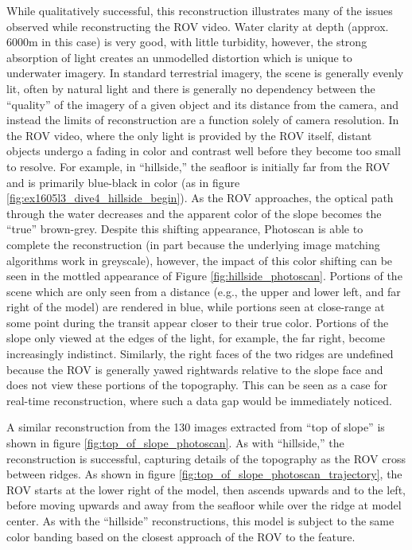 \documentclass[letterpaper,12pt]{article}
\begin{document}
While qualitatively successful, this reconstruction illustrates many of the issues observed while reconstructing the ROV video.    Water clarity at depth (approx. 6000m in this case) is very good, with little turbidity, however, the strong absorption of light creates an unmodelled distortion which is unique to underwater imagery.   In standard terrestrial imagery, the scene is generally evenly lit, often by natural light and there is generally no dependency between the ``quality'' of the imagery of a given object and its distance from the camera, and instead the limits of reconstruction are a function solely of camera resolution.   In the ROV video, where the only light is provided by the ROV itself, distant objects undergo a fading in color and contrast well before they become too small to resolve.   For example, in ``hillside,'' the seafloor is initially far from the ROV and is primarily blue-black in color (as in figure \ref{fig:ex1605l3_dive4_hillside_begin}).  As the ROV approaches, the optical path through the water decreases and the apparent color of the slope becomes the ``true'' brown-grey.   Despite this shifting appearance, Photoscan is able to complete the reconstruction (in part because the underlying image matching algorithms work in greyscale), however, the impact of this color shifting can be seen in the mottled appearance of Figure \ref{fig:hillside_photoscan}. 
Portions of the scene which are only seen from a distance (e.g., the upper and lower left, and far right of the model) are rendered in blue, while portions seen at close-range at some point during the transit appear closer to their true color.   Portions of the slope only viewed at the edges of the light, for example, the far right, become increasingly indistinct.  Similarly, the right faces of the two ridges are undefined because the ROV is generally yawed rightwards relative to the slope face and does not view these portions of the topography.     This can be seen as a case for real-time reconstruction, where such a data gap would be immediately noticed.

A similar reconstruction from the 130 images extracted from ``top of slope'' is shown in figure \ref{fig:top_of_slope_photoscan}.  As with ``hillside,'' the reconstruction is successful, capturing details of the topography as the ROV cross between ridges.   As shown in figure \ref{fig:top_of_slope_photoscan_trajectory}, the ROV starts at the lower right of the model, then ascends upwards and to the left, before moving upwards and away from the seafloor while over the ridge at model center.  As with the ``hillside'' reconstructions, this model is subject to the same color banding based on the closest approach of the ROV to the feature.
\end{document}
